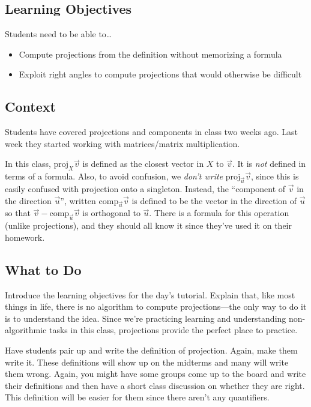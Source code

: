 \documentclass[red]{tutorial}
\newcommand{\Proj}{\mathrm{proj}}
\newcommand{\Comp}{\mathrm{comp}}
\theoremstyle{definition}
\theoremstyle{theorem}
\begin{document}
	\begin{instructions}
\subsection*{Learning Objectives}
	Students need to be able to\ldots
	\begin{itemize}
		\item Compute projections from the definition without memorizing a formula
		\item Exploit right angles to compute projections that would otherwise be
			difficult
	\end{itemize}

\subsection*{Context}
	Students have covered projections and components in class two weeks ago. Last week they started
		working with matrices/matrix multiplication.

	In this class, $\Proj_X\vec v$ is defined as the closest vector in $X$ to $\vec v$. It is \emph{not}
		defined in terms of a formula. Also, to avoid confusion, we \emph{don't write}
		$\Proj_{\vec u}\vec v$, since this is easily confused with projection onto a singleton.
		Instead, the ``component of $\vec v$ in the direction $\vec u$'', written $\Comp_{\vec u}\vec v$
		is defined to be the vector in the direction of $\vec u$ so that $\vec v-\Comp_{\vec u}\vec v$
		is orthogonal to $\vec u$. There is a formula for this operation (unlike projections), and they
		should all know it since they've used it on their homework.

\subsection*{What to Do}
	Introduce the learning objectives for the day's tutorial. Explain that, like most things in life,
		there is no algorithm to compute projections---the only way to do it is to understand
		the idea. Since we're practicing learning and understanding non-algorithmic tasks in this
		class, projections provide the perfect place to practice.

	Have students pair up and write the definition of projection. Again, make them
		write it. These definitions will show up on the midterms and many will
		write them wrong. Again, you might have some groups come up to the board and
		write their definitions and then have a short class discussion on whether they are right.
		This definition will be easier for them since there aren't any quantifiers.


\end{instructions}
\end{document}
